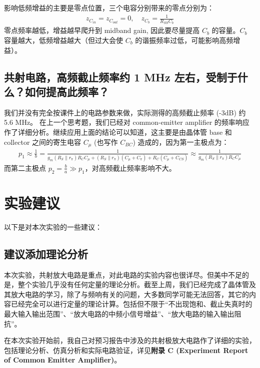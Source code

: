 \documentclass[UTF8]{article}
\begin{document}
\noindent 影响低频增益的主要是零点位置，三个电容分别带来的零点分别为：
\begin{gather}
z_{C_{in}} = z_{C_{out}} = 0,\quad 
z_{C_{b}} = \frac{1}{R_{SS} C_b}
\end{gather}
零点频率越低，增益越早爬升到 midband gain, 因此要尽量提高 $C_{b}$ 的容量。$C_b$ 容量越大，低频增益越大（但过大会使 $C_b$ 的谐振频率过低，可能影响高频增益）。





\subsection{共射电路，高频截止频率约 1 MHz 左右，受制于什么？如何提高此频率？}

我们并没有完全按课件上的电路参数来做，实际测得的高频截止频率 (-3dB) 约 5.6 MHz。
在上一个思考题，我们已经对 common-emitter amplifier 的频率响应作了详细分析。继续应用上面的结论可以知道，这主要是由晶体管 base 和 collector 之间的寄生电容 $C_{\mu}$ (也写作 $C_{BC}$) 造成的，因为第一主极点为：
\begin{gather}
p_1 \approx \frac{1}{b} = \frac{1}{g_m (R_S \parallel r_{\pi}) R_C C_{\mu} + (R_S \parallel r_{\pi}) (C_{\mu} + C_{\pi}) + R_C (C_{\mu} + C_{CS})}
\approx 
\frac{1}{g_m (R_S \parallel r_{\pi}) R_C C_{\mu}}
\end{gather}
而第二主极点 $p_2 = \frac{b}{a} \gg p_1$，对高频截止频率影响不大。


\newpage
\section{实验建议}

\noindent 以下是对本次实验的一些建议：

\subsection{建议添加理论分析}

本次实验，共射放大电路是重点，对此电路的实验内容也很详尽。但美中不足的是，整个实验几乎没有任何定量的理论分析。截至上周，我们已经完成了晶体管及其放大电路的学习，除了与频响有关的问题，大多数同学可能无法回答，其它的内容已经完全可以进行定量的理论计算。包括但不限于“不出现饱和、截止失真时的最大输入输出范围”、“放大电路的中频小信号增益”、“放大电路的输入输出阻抗”。

在本次实验开始前，我自己对预习报告中涉及的共射极放大电路作了详细的实验，包括理论分析、仿真分析和实际电路验证，详见\textbf{附录 C (Experiment Report of Common Emitter Amplifier)}。
\end{document}
